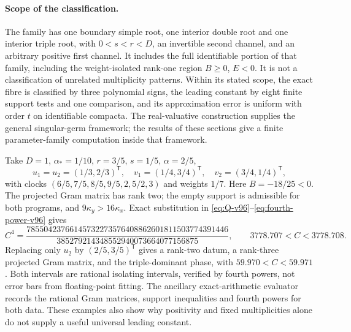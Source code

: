 \paragraph{Scope of the classification.}
The family has one boundary simple root, one interior double root and
one interior triple root, with $0<s<r<D$, an invertible second channel,
and an arbitrary positive first channel. It includes the full
identifiable portion of that family, including the weight-isolated
rank-one region $B\ge0$, $E<0$. It is not a classification of unrelated
multiplicity patterns. Within its stated scope, the exact fibre is
classified by three polynomial signs, the leading constant by eight
finite support tests and one comparison, and its approximation error
is uniform with order $t$ on identifiable compacta. The real-valuative
construction supplies the general singular-germ framework; the results
of these sections give a finite parameter-family computation inside
that framework.

\begin{example}
\label{ex:exact-constant-v96}
Take $D=1$, $\alpha_*=1/10$, $r=3/5$, $s=1/5$, $\alpha=2/5$,
\[
 u_1=u_2=(1/3,2/3)^{\mathsf T},\quad
 v_1=(1/4,3/4)^{\mathsf T},\quad v_2=(3/4,1/4)^{\mathsf T},
\]
with clocks $(6/5,7/5,8/5,9/5,2,5/2,3)$ and weights $1/7$.
Here $B=-18/25<0$. The projected Gram matrix has rank two; the empty
support is admissible for both programs, and $9\kappa_y>16\kappa_x$.
Exact substitution in \eqref{eq:Q-v96}--\eqref{eq:fourth-power-v96} gives
\[
 C^4=
 \frac{78550423766145732273576408862601811503774391446}
      {385279214348552940073664077156875},
 \qquad 3778.707<C<3778.708.
\]
Replacing only $u_2$ by $(2/5,3/5)^{\mathsf T}$ gives a rank-two datum,
a rank-three projected Gram matrix, and the triple-dominant phase, with
$59.970<C<59.971$. Both intervals are rational isolating intervals,
verified by fourth powers, not error bars from floating-point fitting.
The ancillary exact-arithmetic evaluator records the rational Gram
matrices, support inequalities and fourth powers for both data.
These examples also show why positivity and fixed multiplicities alone
do not supply a useful universal leading constant.
\end{example}
